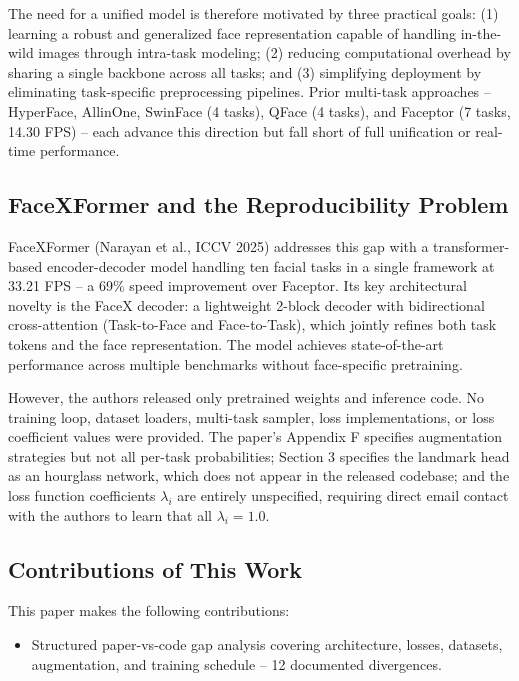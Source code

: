 \documentclass[11pt]{article}
\begin{document}
The need for a unified model is therefore motivated by three practical goals: (1) learning a robust and generalized face representation capable of handling in-the-wild images through intra-task modeling; (2) reducing computational overhead by sharing a single backbone across all tasks; and (3) simplifying deployment by eliminating task-specific preprocessing pipelines. Prior multi-task approaches -- HyperFace, AllinOne, SwinFace (4 tasks), QFace (4 tasks), and Faceptor (7 tasks, 14.30 FPS) -- each advance this direction but fall short of full unification or real-time performance.



\subsection{FaceXFormer and the Reproducibility Problem}

FaceXFormer (Narayan et al., ICCV 2025) addresses this gap with a transformer-based encoder-decoder model handling ten facial tasks in a single framework at 33.21 FPS -- a 69\% speed improvement over Faceptor. Its key architectural novelty is the FaceX decoder: a lightweight 2-block decoder with bidirectional cross-attention (Task-to-Face and Face-to-Task), which jointly refines both task tokens and the face representation. The model achieves state-of-the-art performance across multiple benchmarks without face-specific pretraining.

However, the authors released only pretrained weights and inference code. No training loop, dataset loaders, multi-task sampler, loss implementations, or loss coefficient values were provided. The paper's Appendix F specifies augmentation strategies but not all per-task probabilities; Section 3 specifies the landmark head as an hourglass network, which does not appear in the released codebase; and the loss function coefficients $\lambda_i$ are entirely unspecified, requiring direct email contact with the authors to learn that all $\lambda_i = 1.0$.



\subsection{Contributions of This Work}

This paper makes the following contributions:

\begin{itemize}\item Structured paper-vs-code gap analysis covering architecture, losses, datasets, augmentation, and training schedule -- 12 documented divergences.\end{itemize}
\end{document}
